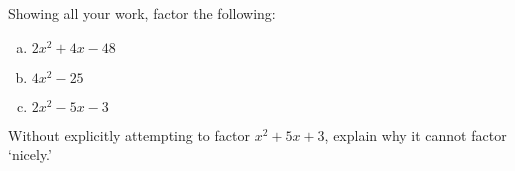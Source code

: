 \documentclass[11pt,letterpaper]{article}
\begin{document}

\problem Showing all your work, factor the following:
	\begin{enumerate}[(a)]
	\item $2x^2 + 4x - 48$
	\item $4x^2 - 25$
	\item $2x^2 - 5x - 3$
	\end{enumerate}


\vfill


\problem Without explicitly attempting to factor $x^2 + 5x + 3$, explain why it cannot factor `nicely.'

\vspace{5cm}
\end{document}
